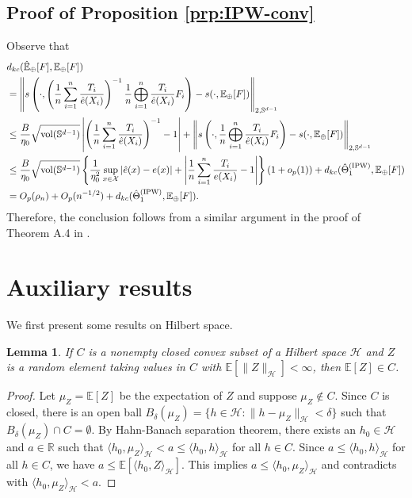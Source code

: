 \documentclass[11pt,reqno]{amsart}
\newtheorem{lemma}{Lemma}
\begin{document}
\subsection{Proof of Proposition \ref{prp:IPW-conv}}
Observe that 
\begin{align*}
&d_{kc}(\hat{\mathbb{E}}_\oplus[F],\mathbb{E}_\oplus[F])\\ 
&= \left\|s\left(\cdot, \left({1 \over n}\sum_{i=1}^n {T_i \over \hat{e}(X_i)}\right)^{-1}{1 \over n}\bigoplus_{i=1}^n {T_i \over \hat{e}(X_i)}F_i\right) - s(\cdot, \mathbb{E}_\oplus[F])\right\|_{2,\mathbb{S}^{d-1}}\\
&\leq {B \over \eta_0}\sqrt{\mathrm{vol}(\mathbb{S}^{d-1})}\left|\left({1 \over n}\sum_{i=1}^n {T_i \over \hat{e}(X_i)}\right)^{-1}-1\right| + \left\|s\left(\cdot, {1 \over n}\bigoplus_{i=1}^n {T_i \over \hat{e}(X_i)}F_i\right) - s(\cdot, \mathbb{E}_\oplus[F])\right\|_{2,\mathbb{S}^{d-1}}\\
&\leq {B \over \eta_0}\sqrt{\mathrm{vol}(\mathbb{S}^{d-1})}\left\{{1 \over \eta_0^2}\sup_{x \in \mathcal{X}}|\hat{e}(x) - e(x)| + \left|{1 \over n}\sum_{i=1}^n {T_i \over e(X_i)}-1\right|\right\}(1 + o_p(1)) + d_{kc}(\hat{\Theta}_1^{(\mathrm{IPW})}, \mathbb{E}_\oplus[F])\\
&= O_p(\rho_n) + O_p(n^{-1/2}) + d_{kc}(\hat{\Theta}_1^{(\mathrm{IPW})}, \mathbb{E}_\oplus[F]). 
\end{align*}
Therefore, the conclusion follows from a similar argument in the proof of Theorem A.4 in \cite{KuZhOtMu24}. 

\section{Auxiliary results}

We first present some results on Hilbert space.

\begin{lemma}\label{lem:convex-hilbert-exp}
If $C$ is a nonempty closed convex subset of a Hilbert space $\mathcal{H}$ and $Z$ is a random element taking values in $C$ with $\mathbb{E}[\|Z\|_\mathcal{H}]<\infty$, then $\mathbb{E}[Z] \in C$.
\end{lemma}

\begin{proof}
Let $\mu_Z = \mathbb{E}[Z]$ be the expectation of $Z$ and suppose $\mu_Z \notin C$. Since $C$ is closed, there is an open ball $B_\delta(\mu_Z) = \{h \in \mathcal{H}: \|h - \mu_Z\|_\mathcal{H}<\delta\}$ such that $B_\delta(\mu_Z) \cap C = \emptyset$. By Hahn-Banach separation theorem, %
there exists an $h_0 \in \mathcal{H}$ and $a \in \mathbb{R}$ such that $\langle h_0, \mu_Z \rangle_\mathcal{H} < a \leq \langle h_0, h \rangle_\mathcal{H}$ for all $h \in C$. Since $a \leq \langle h_0, h \rangle_\mathcal{H}$ for all $h \in C$, we have $a \leq \mathbb{E}[\langle h_0, Z \rangle_\mathcal{H}]$. This implies $a \leq \langle h_0, \mu_Z \rangle_\mathcal{H}$ and contradicts with $\langle h_0, \mu_Z \rangle_\mathcal{H}<a$. 
\end{proof}
\end{document}

